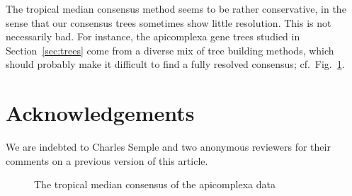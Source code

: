 \documentclass[a4paper,12pt]{amsart}
\theoremstyle{remark}
\newenvironment{acknowledgements}{\begin{acknowledgement}}
{\end{acknowledgement}}
\begin{document}
The tropical median consensus method seems to be rather conservative, in the sense that our consensus trees sometimes show little resolution.
This is not necessarily bad.
For instance, the apicomplexa gene trees studied in Section~\ref{sec:trees} come from a diverse mix of tree building methods, which should probably make it difficult to find a fully resolved consensus; cf.\ Fig.~\ref{fig:api_tree}.

\section*{Acknowledgements}
  We are indebted to Charles Semple and two anonymous reviewers for their comments on a previous version of this article.

\begin{figure}
  \centering
  \caption{The tropical median consensus of the apicomplexa data}
  \label{fig:api_tree}
\end{figure}

%
%



 \printbibliography
\end{document}
